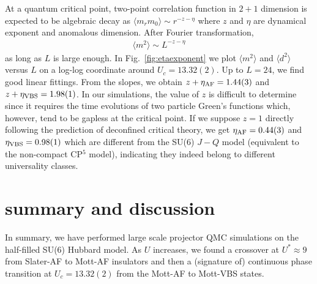 \documentclass[twocolumn,superscriptaddress]{revtex4-1}
\begin{document}
At a quantum critical point, two-point correlation function in $2+1$ dimension is expected to be algebraic decay as $\langle m_rm_0\rangle\sim r^{-z-\eta}$ where $z$ and $\eta$ are dynamical exponent and anomalous dimension. \cite{Sondhi_RMP_1997} After Fourier transformation, \begin{eqnarray} \langle m^2 \rangle \sim L^{-z-\eta} \end{eqnarray}
as long as $L$ is large enough. In Fig.~\ref{fig:etaexponent} we plot $\langle m^2 \rangle$ and $\langle d^2\rangle$ versus $L$ on a log-log coordinate around $U_c=13.32(2)$. Up to $L=24$, we find good linear fittings. From the slopes, we obtain $z+\eta_{\rm AF}=1.44(3)$ and $z+\eta_{\rm VBS}=1.98(1)$. In our simulations, the value of $z$ is difficult to determine since it requires the time evolutions of two particle Green's functions which, however, tend to be gapless at the critical point. If we suppose $z=1$ directly following the prediction of deconfined critical theory, \cite{Senthil_S_2004,*Senthil_PRB_2004,*Levin_PRB_2004} we get $\eta_{\rm AF}=0.44(3)$ and $\eta_{\rm VBS}=0.98(1)$ which are different from the SU(6) $J-Q$ model (equivalent to the non-compact CP$^5$ model), \cite{Kaul_PRL_2012} indicating they indeed belong to different universality classes. 




\section{summary and discussion}
In summary, we have performed large scale projector QMC simulations on the half-filled SU(6) Hubbard model. As $U$ increases, we found a crossover at $U^*\approx9$ from Slater-AF to Mott-AF insulators and then a (signature of) continuous phase transition at $U_c=13.32(2)$ from the Mott-AF to Mott-VBS states. 
\end{document}
